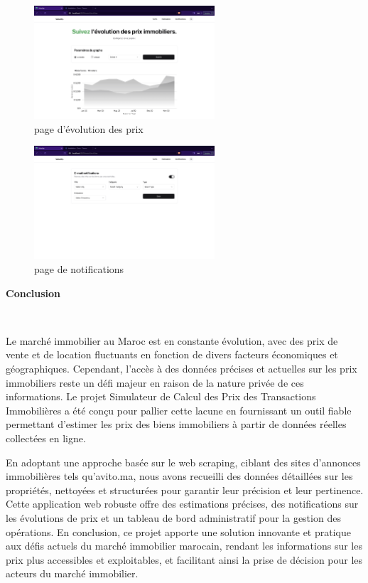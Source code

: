 \documentclass[a4paper,12pt]{report}
\numberwithin{equation}{section}
\begin{document}
\begin{figure}[H]
    \centering
    \includegraphics[width=0.6\textwidth]{screens/estimation2.png}
    \caption{page d'évolution des prix}
    \label{fig:page d'évolution des prix}
\end{figure}
\begin{figure}[H]
    \centering
    \includegraphics[width=0.6\textwidth]{screens/notif.png}
    \caption{page de notifications}
    \label{fig:page de notifications}
\end{figure}
\newpage

\vspace*{3.5cm}
\begin{center}
    {\huge\bfseries Conclusion\par} \
\end{center}
{\large  \par
Le marché immobilier au Maroc est en constante évolution, avec des prix de vente et de location fluctuants en fonction de divers facteurs économiques et géographiques. Cependant, l'accès à des données précises et actuelles sur les prix immobiliers reste un défi majeur en raison de la nature privée de ces informations. Le projet Simulateur de Calcul des Prix des Transactions Immobilières a été conçu pour pallier cette lacune en fournissant un outil fiable permettant d'estimer les prix des biens immobiliers à partir de données réelles collectées en ligne. 
\\ \par
En adoptant une approche basée sur le web scraping, ciblant des sites d'annonces immobilières tels qu'avito.ma, nous avons recueilli des données détaillées sur les propriétés, nettoyées et structurées pour garantir leur précision et leur pertinence. Cette application web robuste offre des estimations précises, des notifications sur les évolutions de prix et un tableau de bord administratif pour la gestion des opérations. En conclusion, ce projet apporte une solution innovante et pratique aux défis actuels du marché immobilier marocain, rendant les informations sur les prix plus accessibles et exploitables, et facilitant ainsi la prise de décision pour les acteurs du marché immobilier.
}
\newpage
\end{document}
